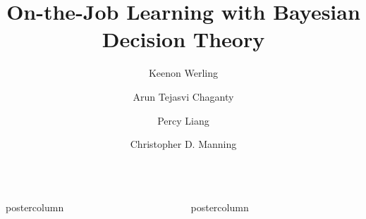 \documentclass[final,xcolor={svgnames}]{beamer}
\title{On-the-Job Learning with Bayesian Decision Theory}
\author{Keenon Werling \and Arun Tejasvi Chaganty \and Percy Liang \and Christopher D. Manning}
\institute[Stanford University]{Department of Computer Science\\ Stanford University}
\newlength{\columnheight}
\begin{document}
\begin{frame}
  \begin{columns}
    \begin{column}{.32\textwidth}
      \begin{beamercolorbox}[center,wd=\textwidth]{postercolumn}
        \begin{minipage}[T]{.95\textwidth}  %
          \parbox[t][\columnheight]{\textwidth}{%
            
          }
        \end{minipage}
      \end{beamercolorbox}
    \end{column}

    \begin{column}{.32\textwidth}
      \begin{beamercolorbox}[center,wd=\textwidth]{postercolumn}
        \begin{minipage}[T]{.95\textwidth} %
          \parbox[t][\columnheight]{\textwidth}{%
            
          }
        \end{minipage}
      \end{beamercolorbox}
    \end{column}


\end{columns}
\end{frame}
\end{document}
